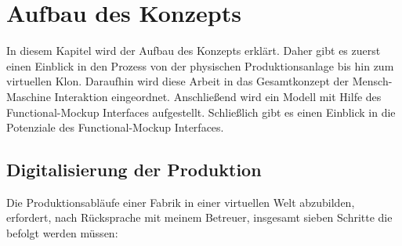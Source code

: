 \chapter{Aufbau des Konzepts}\label{cha:AufbauDesKonzepts}

In diesem Kapitel wird der Aufbau des Konzepts erklärt. Daher gibt es zuerst einen Einblick in den Prozess von der physischen Produktionsanlage bis hin zum virtuellen Klon. Daraufhin wird diese Arbeit in das Gesamtkonzept der Mensch-Maschine Interaktion eingeordnet. Anschließend wird ein Modell mit Hilfe des Functional-Mockup Interfaces aufgestellt. Schließlich gibt es einen Einblick in die Potenziale des Functional-Mockup Interfaces.

\section{Digitalisierung der Produktion}\label{sec:PhysischZumKlon}
Die Produktionsabläufe einer Fabrik in einer virtuellen Welt abzubilden, erfordert, nach Rücksprache mit meinem Betreuer, insgesamt sieben Schritte die befolgt werden müssen:

